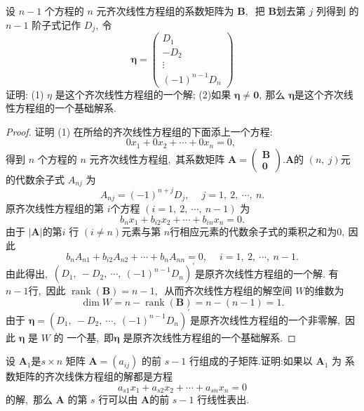 \newpage
\begin{problem}
	设 $ n-1$  个方程的 $ n$  元齐次线性方程组的系数矩阵为  $\boldsymbol{B} ,\ $ 把 $ \boldsymbol{B}  $划去第  $j $ 列得到 的 $ n-1 $ 阶子式记作  $D_{j} ,\  $令
	$$\boldsymbol{\eta}=\left(\begin{array}{c}
		D_{1} \\
		-D_{2} \\
		\vdots \\
		(-1)^{n-1} D_{n}
	\end{array}\right)$$
	证明: (1)  $\eta$  是这个齐次线性方程组的一个解;
	(2)如果  $\boldsymbol{\eta} \neq \mathbf{0} ,\  $那么  $\boldsymbol{\eta}  $是这个齐次线性方程组的一个基础解系.
\end{problem}
\begin{proof}
	证明 (1) 在所给的齐次线性方程组的下面添上一个方程:
	$$0 x_{1}+0 x_{2}+\cdots+0 x_{n}=0,\ $$
	得到  $n$  个方程的  $n $ 元齐次线性方程组,\  其系数矩阵  $\boldsymbol{A}=\left(\begin{array}{c}\boldsymbol{B} \\ \mathbf{0}\end{array}\right) . $$ \boldsymbol{A}  $的  $(n,\  j)  $元的代数余子式 $ A_{n j} $ 为
	$$A_{n j}=(-1)^{n+j} D_{j},\  \quad j=1,\ 2,\  \cdots,\  n .$$
	原齐次线性方程组的第 $ i  $个方程  $(i=1,\ 2,\  \cdots,\  n-1)$  为
	$$b_{n} x_{1}+b_{i 2} x_{2}+\cdots+b_{i n} x_{n}=0 .$$
	由于 $ |\boldsymbol{A}|  $的第$  i$  行  $(i \neq n)  $元素与第 $ n  $行相应元素的代数余子式的乘积之和为$ 0 ,\  $因此
	$$b_{n} A_{n 1}+b_{i 2} A_{n 2}+\cdots+b_{n} A_{n n}=0,\  \quad i=1,\ 2,\  \cdots,\  n-1.$$
	由此得出,\  $ \left(D_{1},\ -D_{2},\  \cdots,\ (-1)^{n-1} D_{n}\right)^{\prime}  $是原齐次线性方程组的一个解. 有 $ n-1  $行,\  因此  $\operatorname{rank}(\boldsymbol{B})=n-1 ,\ $ 从而齐次线性方程组的解空间  $W  $的维数为
	$$\operatorname{dim} W=n-\operatorname{rank}(\boldsymbol{B})=n-(n-1)=1 .$$
	由于 $ \boldsymbol{\eta}=\left(D_{1},\ -D_{2},\  \cdots,\ (-1)^{n-1} D_{n}\right)^{\prime}  $是原齐次线性方程组的一个非零解,\  因此  $\boldsymbol{\eta}$  是  $W $ 的 一个基,\ 即$ \boldsymbol{\eta} $ 是原齐次线性方程组的一个基础解系.
\end{proof}
\newpage
\begin{problem}
	设  $\boldsymbol{A}_{1}  $是$  s \times n$  矩阵  $\boldsymbol{A}=\left(a_{i j}\right)$  的前  $s-1 $ 行组成的子矩阵.证明:如果以  $\boldsymbol{A}_{1} $ 为 系数矩阵的齐次线侏方程组的解都是方程
	$$a_{s1} x_{1}+a_{s2} x_{2}+\cdots+a_{sn} x_{n}=0$$
	的解,\ 那么 $ \boldsymbol{A} $ 的第 $ s$  行可以由  $\boldsymbol{A}  $的前 $ s-1$  行线性表出.
\end{problem}
